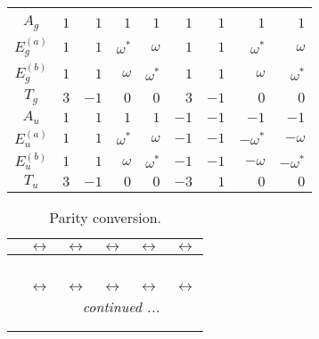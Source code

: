 \documentclass[fleqn,10pt,landscape]{article}
\begin{document}
\begin{itemize}
\begin{center}
\begin{longtable}{c|rrrrrrrr}
 \hline \hline
\multicolumn{8}{r}{} \\ \endlastfoot

$ A_{g} $ & $ 1 $ & $ 1 $ & $ 1 $ & $ 1 $ & $ 1 $ & $ 1 $ & $ 1 $ & $ 1 $ \\
$ E_{g}^{(a)} $ & $ 1 $ & $ 1 $ & $ \omega^{*} $ & $ \omega $ & $ 1 $ & $ 1 $ & $ \omega^{*} $ & $ \omega $ \\
$ E_{g}^{(b)} $ & $ 1 $ & $ 1 $ & $ \omega $ & $ \omega^{*} $ & $ 1 $ & $ 1 $ & $ \omega $ & $ \omega^{*} $ \\
$ T_{g} $ & $ 3 $ & $ -1 $ & $ 0 $ & $ 0 $ & $ 3 $ & $ -1 $ & $ 0 $ & $ 0 $ \\
$ A_{u} $ & $ 1 $ & $ 1 $ & $ 1 $ & $ 1 $ & $ -1 $ & $ -1 $ & $ -1 $ & $ -1 $ \\
$ E_{u}^{(a)} $ & $ 1 $ & $ 1 $ & $ \omega^{*} $ & $ \omega $ & $ -1 $ & $ -1 $ & $ - \omega^{*} $ & $ - \omega $ \\
$ E_{u}^{(b)} $ & $ 1 $ & $ 1 $ & $ \omega $ & $ \omega^{*} $ & $ -1 $ & $ -1 $ & $ - \omega $ & $ - \omega^{*} $ \\
$ T_{u} $ & $ 3 $ & $ -1 $ & $ 0 $ & $ 0 $ & $ -3 $ & $ 1 $ & $ 0 $ & $ 0 $ \\
\end{longtable}
\end{center}
\begin{center}
\renewcommand{\arraystretch}{1.0}
\begin{longtable}{cccccc}
\caption{Parity conversion.}
 \\
 \hline \hline
 & $\leftrightarrow$ & $\leftrightarrow$ & $\leftrightarrow$ & $\leftrightarrow$ & $\leftrightarrow$ \\ \hline \endfirsthead

\multicolumn{5}{l}{\tablename\ \thetable{}} \\
 \hline \hline
 & $\leftrightarrow$ & $\leftrightarrow$ & $\leftrightarrow$ & $\leftrightarrow$ & $\leftrightarrow$ \\ \hline \endhead

 \hline \hline
\multicolumn{5}{r}{\footnotesize\it continued ...} \\ \endfoot

 \hline \hline
\multicolumn{5}{r}{} \\ \endlastfoot


\end{longtable}
\end{center}
\end{itemize}
\end{document}
